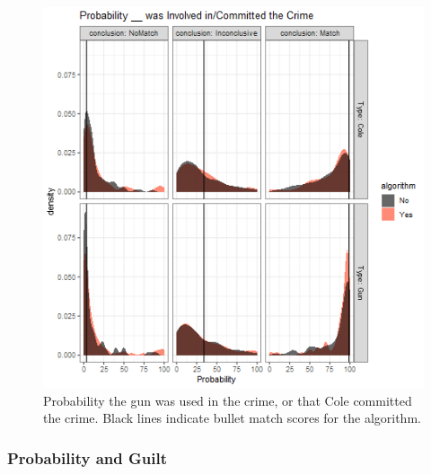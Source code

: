 \documentclass[print]{nuthesis}
\begin{document}
\begin{figure}

{\centering \includegraphics[width=\linewidth]{images/probalgorithm} 

}

\caption{Probability the gun was used in the crime, or that Cole committed the crime. Black lines indicate bullet match scores for the algorithm.}\label{fig:probalgorithm}
\end{figure}

\hypertarget{probability-and-guilt}{%
\subsubsection{Probability and Guilt}\label{probability-and-guilt}}
\end{document}
